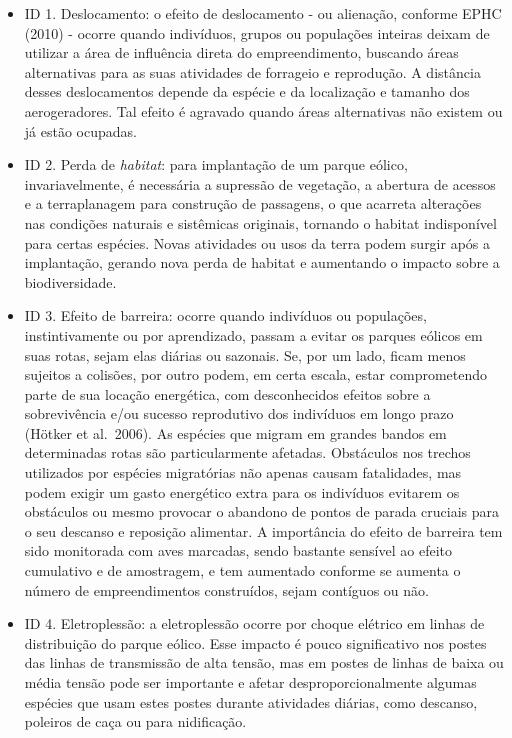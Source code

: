 \documentclass[
  oneside]{scrbook}
\providecommand{\tightlist}{%
  \setlength{\itemsep}{0pt}\setlength{\parskip}{0pt}}
\begin{document}
\begin{itemize}
\tightlist
\item
  ID 1. Deslocamento: o efeito de deslocamento - ou alienação, conforme EPHC (2010) - ocorre quando indivíduos, grupos ou populações inteiras deixam de utilizar a área de influência direta do empreendimento, buscando áreas alternativas para as suas atividades de forrageio e reprodução. A distância desses deslocamentos depende da espécie e da localização e tamanho dos aerogeradores. Tal efeito é agravado quando áreas alternativas não existem ou já estão ocupadas.
\item
  ID 2. Perda de \emph{habitat}: para implantação de um parque eólico, invariavelmente, é necessária a supressão de vegetação, a abertura de acessos e a terraplanagem para construção de passagens, o que acarreta alterações nas condições naturais e sistêmicas originais, tornando o habitat indisponível para certas espécies. Novas atividades ou usos da terra podem surgir após a implantação, gerando nova perda de habitat e aumentando o impacto sobre a biodiversidade.
\item
  ID 3. Efeito de barreira: ocorre quando indivíduos ou populações, instintivamente ou por aprendizado, passam a evitar os parques eólicos em suas rotas, sejam elas diárias ou sazonais. Se, por um lado, ficam menos sujeitos a colisões, por outro podem, em certa escala, estar comprometendo parte de sua locação energética, com desconhecidos efeitos sobre a sobrevivência e/ou sucesso reprodutivo dos indivíduos em longo prazo (Hötker et al.~2006). As espécies que migram em grandes bandos em determinadas rotas são particularmente afetadas. Obstáculos nos trechos utilizados por espécies migratórias não apenas causam fatalidades, mas podem exigir um gasto energético extra para os indivíduos evitarem os obstáculos ou mesmo provocar o abandono de pontos de parada cruciais para o seu descanso e reposição alimentar. A importância do efeito de barreira tem sido monitorada com aves marcadas, sendo bastante sensível ao efeito cumulativo e de amostragem, e tem aumentado conforme se aumenta o número de empreendimentos construídos, sejam contíguos ou não.
\item
  ID 4. Eletroplessão: a eletroplessão ocorre por choque elétrico em linhas de distribuição do parque eólico. Esse impacto é pouco significativo nos postes das linhas de transmissão de alta tensão, mas em postes de linhas de baixa ou média tensão pode ser importante e afetar desproporcionalmente algumas espécies que usam estes postes durante atividades diárias, como descanso, poleiros de caça ou para nidificação.

\end{itemize}
\end{document}
